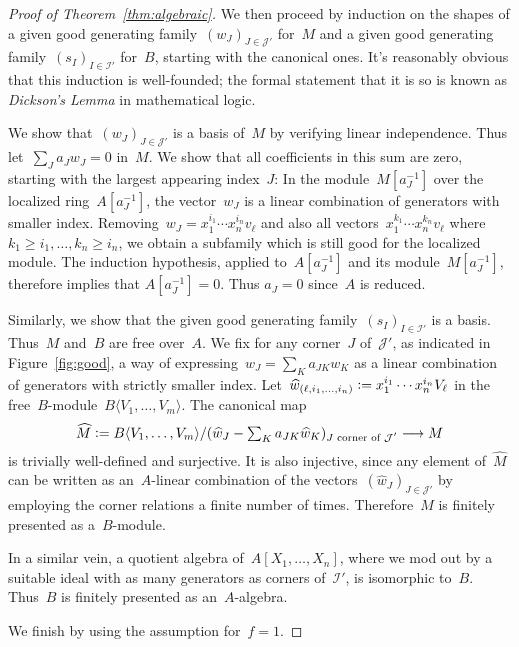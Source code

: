 \documentclass{amsart}
\theoremstyle{definition}
\theoremstyle{plain}
\theoremstyle{remark}
\newcommand{\I}{\mathcal{I}}
\newcommand{\J}{\mathcal{J}}
\newcommand{\defeq}{\vcentcolon=}
\begin{document}
\begin{proof}[Proof of Theorem~\ref{thm:algebraic}]
We then proceed by induction on the
shapes of a given good generating family~$(w_J)_{J \in \J'}$ for~$M$ and a given
good generating family~$(s_I)_{I \in \I'}$ for~$B$, starting with the canonical ones. It's
reasonably obvious that this induction is well-founded; the formal statement
that it is so is known as \emph{Dickson's Lemma} in mathematical logic.

We show that~$(w_J)_{J \in \J'}$ is a basis of~$M$ by verifying linear
independence. Thus let~$\sum_J a_J w_J = 0$ in~$M$. We show that all
coefficients in this sum are zero, starting with the largest
appearing index~$J$: In the module~$M[a_J^{-1}]$ over the localized ring~$A[a_J^{-1}]$,
the vector~$w_J$ is a linear combination of generators with
smaller index. Removing~$w_J = x_1^{i_1} \cdots x_n^{i_n} v_\ell$ and also all
vectors~$x_1^{k_1} \cdots x_n^{k_n} v_\ell$ where~$k_1 \geq i_1, \ldots,
k_n \geq i_n$, we obtain a subfamily which is still good for
the localized module. The induction hypothesis, applied
to~$A[a_J^{-1}]$ and its module~$M[a_J^{-1}]$, therefore implies that $A[a_J^{-1}] = 0$.
Thus $a_J = 0$ since~$A$ is reduced.
\enlargethispage{2em}

Similarly, we show that the given good generating family~$(s_I)_{I \in \I'}$ is
a basis. Thus~$M$ and~$B$ are free over~$A$. We fix for any corner~$J$
of~$\J'$, as indicated in Figure~\ref{fig:good},
a way of expressing~$w_J = \sum_K a_{JK} w_K$ as a linear combination of
generators with strictly smaller index. Let~$\widehat w_{(\ell,i_1,\ldots,i_n)}
\defeq x_1^{i_1} \cdots x_n^{i_n} V_\ell$ in the free~$B$-module~$B\langle
V_1,\ldots, V_m\rangle$. The canonical map
\[ \widehat M \defeq B\langle V_1,\ldots, V_m\rangle/
  (\widehat w_J - \textstyle\sum_K a_{JK} \widehat w_K)_{\text{$J$ corner of~$\J'$}} \longrightarrow M
\]
is trivially well-defined and surjective. It is also injective, since any
element of~$\widehat M$ can be written as an~$A$-linear combination of the
vectors~$(\widehat w_J)_{J \in \J'}$ by employing the corner relations a finite
number of times.  Therefore~$M$ is finitely presented as a~$B$-module.

In a similar vein, a quotient algebra of~$A[X_1,\ldots,X_n]$, where
we mod out by a suitable ideal with as many generators as corners of~$\I'$, is
isomorphic to~$B$. Thus~$B$ is finitely presented as an~$A$-algebra.

We finish by using the assumption for~$f = 1$.
\end{proof}


\printbibliography
\end{document}
